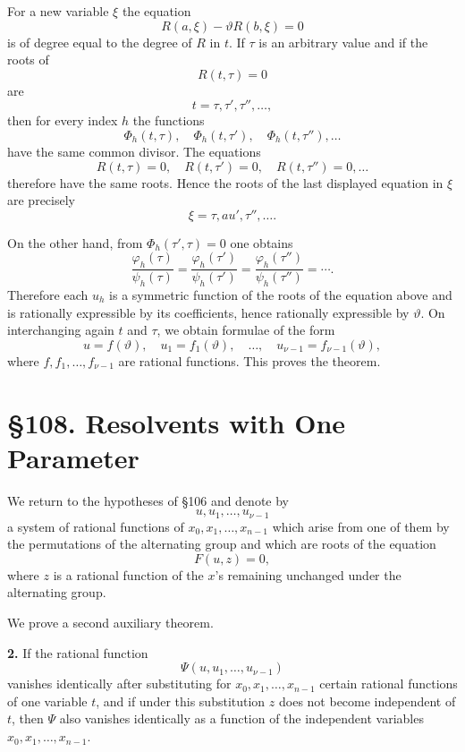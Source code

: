 \documentclass[11pt,a4paper]{book}
\newcommand{\webersection}[2]{\clearpage\section*{\S #1. #2}}
\begin{document}
For a new variable $\xi$ the equation
\begin{equation}
 R(a,\xi)-\vartheta R(b,\xi)=0
\end{equation}
is of degree equal to the degree of $R$ in $t$.  If $\tau$ is an arbitrary value and if the roots of
\[
 R(t,\tau)=0
\]
are
\[
 t=\tau,\tau',\tau'',\ldots,
\]
then for every index $h$ the functions
\[
 \Phi_h(t,\tau),\quad \Phi_h(t,\tau'),\quad \Phi_h(t,\tau''),\ldots
\]
have the same common divisor.  The equations
\[
 R(t,\tau)=0,
 \quad R(t,\tau')=0,
 \quad R(t,\tau'')=0,
 \ldots
\]
therefore have the same roots.  Hence the roots of the last displayed equation in $\xi$ are precisely
\[
 \xi=\tau,	au',\tau'',\ldots.
\]

On the other hand, from $\Phi_h(\tau',\tau)=0$ one obtains
\[
 \frac{\varphi_h(\tau)}{\psi_h(\tau)}
 =\frac{\varphi_h(\tau')}{\psi_h(\tau')}
 =\frac{\varphi_h(\tau'')}{\psi_h(\tau'')}
 =\cdots.
\]
Therefore each $u_h$ is a symmetric function of the roots of the equation above and is rationally expressible by its coefficients, hence rationally expressible by $\vartheta$.  On interchanging again $t$ and $\tau$, we obtain formulae of the form
\begin{equation}
 u=f(\vartheta),\quad u_1=f_1(\vartheta),\quad\ldots,\quad
 u_{\nu-1}=f_{\nu-1}(\vartheta),
\end{equation}
where $f,f_1,\ldots,f_{\nu-1}$ are rational functions.  This proves the theorem.

\webersection{108}{Resolvents with One Parameter}

We return to the hypotheses of \S 106 and denote by
\[
 u,u_1,\ldots,u_{\nu-1}
\]
a system of rational functions of $x_0,x_1,\ldots,x_{n-1}$ which arise from one of them by the permutations of the alternating group and which are roots of the equation
\begin{equation}
 F(u,z)=0,
\end{equation}
where $z$ is a rational function of the $x$'s remaining unchanged under the alternating group.

We prove a second auxiliary theorem.

\textbf{2.} If the rational function
\[
 \Psi(u,u_1,\ldots,u_{\nu-1})
\]
vanishes identically after substituting for $x_0,x_1,\ldots,x_{n-1}$ certain rational functions of one variable $t$, and if under this substitution $z$ does not become independent of $t$, then $\Psi$ also vanishes identically as a function of the independent variables $x_0,x_1,
\ldots,x_{n-1}$.
\end{document}
